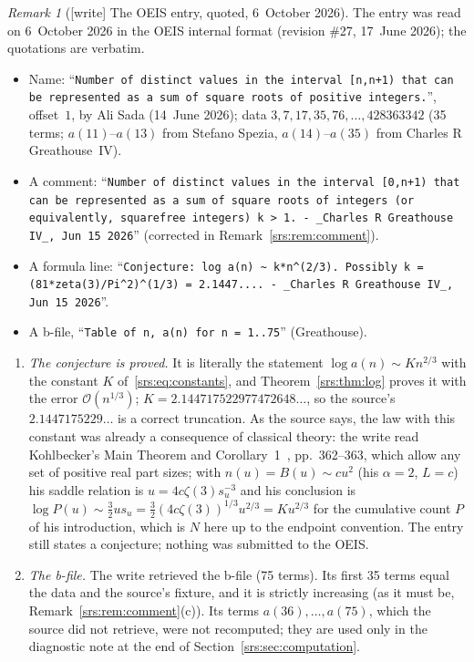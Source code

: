 \documentclass[11pt]{article}
\numberwithin{equation}{section}
\theoremstyle{remark}\newtheorem{remark}[theorem]{Remark}
\newcommand{\Oh}{\mathcal O}
\begin{document}
\begin{remark}[{[write]} The OEIS entry, quoted, 6~October 2026]\label{srs:rem:oeis}
The entry was read on 6~October 2026 in the OEIS internal format (revision
\#27, 17~June 2026); the quotations are verbatim.
\begin{itemize}\raggedright
\item Name: ``\texttt{Number of distinct values in the interval [n,n+1) that
 can be represented as a sum of square roots of positive integers.}'',
 offset~$1$, by Ali Sada (14~June 2026); data
 $3,7,17,35,76,\dots,428363342$ (35 terms; $a(11)$--$a(13)$ from Stefano
 Spezia, $a(14)$--$a(35)$ from Charles R Greathouse~IV).
\item A comment: ``\texttt{Number of distinct values in the interval [0,n+1)
 that can be represented as a sum of square roots of integers (or
 equivalently, squarefree integers) k > 1. - \_Charles R Greathouse IV\_, Jun
 15 2026}'' (corrected in Remark~\ref{srs:rem:comment}).
\item A formula line: ``\texttt{Conjecture: log a(n) \textasciitilde{}
 k*n\^{}(2/3). Possibly k = (81*zeta(3)/Pi\^{}2)\^{}(1/3) = 2.1447.... -
 \_Charles R Greathouse IV\_, Jun 15 2026}''.
\item A b-file, ``\texttt{Table of n, a(n) for n = 1..75}'' (Greathouse).
\end{itemize}
\begin{enumerate}[label=(\alph*)]
\item \emph{The conjecture is proved.} It is literally the statement
 $\log a(n)\sim Kn^{2/3}$ with the constant $K$ of~\eqref{srs:eq:constants},
 and Theorem~\ref{srs:thm:log} proves it with the error $\Oh(n^{1/3})$;
 $K=2.144717522977472648\ldots$, so the source's $2.1447175229\ldots$ is a
 correct truncation. As the source says, the law with this constant was
 already a consequence of classical theory: the write read Kohlbecker's Main
 Theorem and Corollary~1~\cite{Kohlbecker}, pp.~362--363, which allow any set
 of positive real part sizes; with $n(u)=B(u)\sim cu^2$ (his $\alpha=2$,
 $L=c$) his saddle relation is $u=4c\zeta(3)s_u^{-3}$ and his conclusion is
 $\log P(u)\sim\frac32 us_u=\frac32(4c\zeta(3))^{1/3}u^{2/3}=Ku^{2/3}$ for the
 cumulative count $P$ of his introduction, which is $N$ here up to the
 endpoint convention. The entry still states a conjecture; nothing was
 submitted to the OEIS.
\item \emph{The b-file.} The write retrieved the b-file (75 terms). Its first
 35 terms equal the data and the source's fixture, and it is strictly
 increasing (as it must be, Remark~\ref{srs:rem:comment}(c)). Its
 terms $a(36),\dots,a(75)$, which the source did not retrieve, were not
 recomputed; they are used only in the diagnostic note at the end of
 Section~\ref{srs:sec:computation}.
\end{enumerate}
\end{remark}
\end{document}
